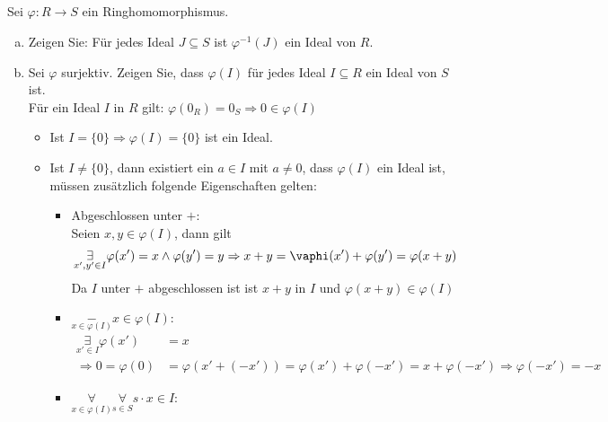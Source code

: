 \documentclass{article}
\begin{document}
\subsection{}
\color{blue}
Sei $\varphi:R\to S$ ein Ringhomomorphismus.
\color{black}
\begin{enumerate}[(a)]
    \item
        \color{blue}
        Zeigen Sie: Für jedes Ideal $J\subseteq S$ ist $\varphi^{-1}(J)$ ein Ideal von $R$.\\
        \color{black}
    \item
        \color{blue}
        Sei $\varphi$ surjektiv. Zeigen Sie, dass $\varphi(I)$ für jedes Ideal $I\subseteq R$ ein Ideal von $S$ ist.\\
        \color{black}
        Für ein Ideal $I$ in $R$ gilt:
        $\varphi(0_R)=0_S\Rightarrow 0\in\varphi(I)$
        \begin{itemize}
            \item
                Ist $I=\{0\}\Rightarrow\varphi(I)=\{0\}$ ist ein Ideal.
            \item
                Ist $I\neq\{0\}$, dann existiert ein $a\in I$ mit $a\neq 0$, dass $\varphi(I)$ ein Ideal ist,
                müssen zusätzlich folgende Eigenschaften gelten:
                \begin{itemize}
                    \item Abgeschlossen unter $+$:\\
                        Seien $x,y\in\varphi(I)$, dann gilt
                        \begin{align*}
                            \underset{x',y'\in I}\exists\varphi(x')=x\land\varphi(y')=y
                            \Rightarrow x+y=\vaphi(x')+\varphi(y')=\varphi(x+y)
                        \end{align*}
                        Da $I$ unter $+$ abgeschlossen ist ist $x+y$ in $I$ und $\varphi(x+y)\in\varphi(I)$
                    \item $\underset{x\in\varphi(I)}-x\in\varphi(I)$:
                        \begin{align*}
                            \underset{x'\in I}\exists\varphi(x')&=x\\
                            \Rightarrow0=\varphi(0)&=\varphi(x'+(-x'))=\varphi(x')+\varphi(-x')
                            =x+\varphi(-x')\Rightarrow\varphi(-x')=-x
                        \end{align*}
                    \item $\underset{x\in\varphi(I)}\forall\underset{s\in S}\forall s\cdot x\in I$:\\

\end{itemize}
\end{itemize}
\end{enumerate}
\end{document}
